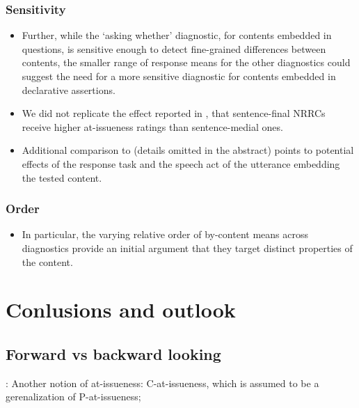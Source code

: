 \documentclass[12pt]{article}
\begin{document}
    \subsubsection{Sensitivity}

      \begin{itemize}
        \item Further, while the `asking whether' diagnostic, for contents embedded in questions, is sensitive enough to detect fine-grained differences between contents, the smaller range of response means for the other diagnostics could suggest the need for a more sensitive diagnostic for contents embedded in declarative assertions.

        \item We did not replicate the effect reported in \citealt{syrett_experimental_2015}, that sentence-final NRRCs receive higher at-issueness ratings than sentence-medial ones.

        \item  Additional comparison to \citealt{syrett_experimental_2015} (details omitted in the abstract) points to potential effects of the response task and the speech act of the utterance embedding the tested content.

      \end{itemize}

    \subsubsection{Order}

      \begin{itemize}
        \item In particular, the varying relative order of by-content means across diagnostics provide an initial argument that they target distinct properties of the content.
      \end{itemize}


\section{Conlusions and outlook}

  \subsection{Forward vs backward looking} %

    \citealt{koev_notions_2018}: Another notion of at-issueness: C-at-issueness, which is assumed to be a gerenalization of P-at-issueness;
\end{document}
